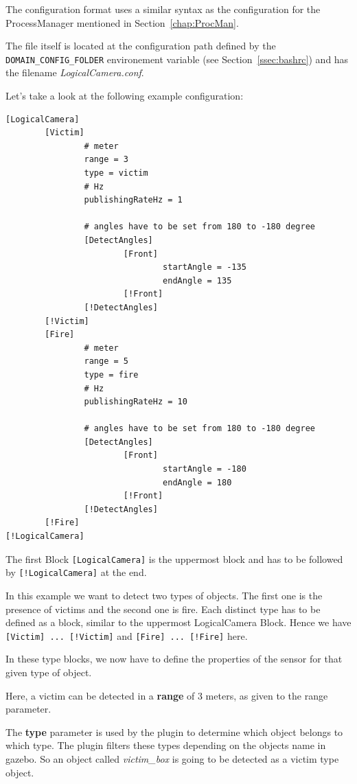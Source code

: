 The configuration format uses a similar syntax as the configuration for the ProcessManager mentioned in Section~\ref{chap:ProcMan}.

The file itself is located at the configuration path defined by the \verb$DOMAIN_CONFIG_FOLDER$ environement variable (see Section~\ref{ssec:bashrc}) and has the filename \textit{LogicalCamera.conf}.

Let's take a look at the following example configuration:

\begin{verbatim}
[LogicalCamera]
        [Victim]
                # meter
                range = 3
                type = victim
                # Hz
                publishingRateHz = 1

                # angles have to be set from 180 to -180 degree
                [DetectAngles]
                        [Front]
                                startAngle = -135
                                endAngle = 135
                        [!Front]
                [!DetectAngles]
        [!Victim]
        [Fire]
                # meter
                range = 5
                type = fire
                # Hz
                publishingRateHz = 10

                # angles have to be set from 180 to -180 degree
                [DetectAngles]
                        [Front]
                                startAngle = -180
                                endAngle = 180
                        [!Front]
                [!DetectAngles]
        [!Fire]
[!LogicalCamera]
\end{verbatim}

The first Block \verb$[LogicalCamera]$ is the uppermost block and has to be followed by \verb$[!LogicalCamera]$ at the end.

In this example we want to detect two types of objects. The first one is the presence of victims and the second one is fire. Each distinct type has to be defined as a block, similar to the uppermost LogicalCamera Block. Hence we have \verb$[Victim] ... [!Victim]$ and \verb$[Fire] ... [!Fire]$ here.

In these type blocks, we now have to define the properties of the sensor for that given type of object.

Here, a victim can be detected in a \textbf{range} of 3 meters, as given to  the range parameter.

The \textbf{type} parameter is used by the plugin to determine which object belongs to which type. The plugin filters these types depending on the objects name in gazebo. So an object called \textit{victim\_box} is going to be detected as a victim type object.

